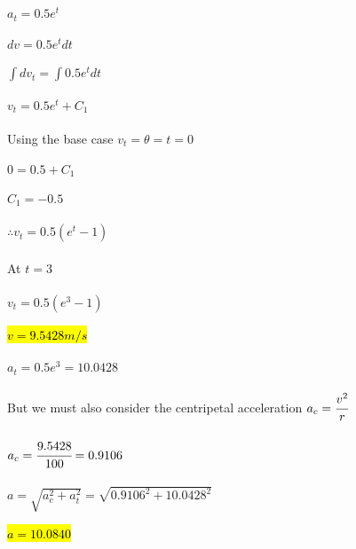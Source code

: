 \documentclass{article}
\begin{document}
\section{}
\subsection{}
$a_t = 0.5e^t$\\ \\
$dv = 0.5e^t dt$\\ \\
$\int dv_t = \int 0.5e^t dt$\\ \\
$v_t = 0.5e^t + C_1$\\ \\
Using the base case $v_t = \theta = t = 0$\\ \\
$0 = 0.5 + C_1$\\ \\
$C_1 = -0.5$\\ \\
$\therefore v_t = 0.5(e^t -1)$ \\ \\
At $t = 3$ \\ \\
$v_t = 0.5(e^3 - 1)$\\ \\
\hl{$v = 9.5428 m/s$}\\ \\
$a_t = 0.5e^3 = 10.0428$\\ \\
But we must also consider the centripetal acceleration $a_c = \cfrac{v^2}{r}$ \\ \\
$a_c = \cfrac{9.5428}{100} = 0.9106$\\ \\
$a = \sqrt{a_c^2 + a_t^2}= \sqrt{0.9106^2 + 10.0428^2}$\\ \\
\hl{$a = 10.0840$}
\end{document}
